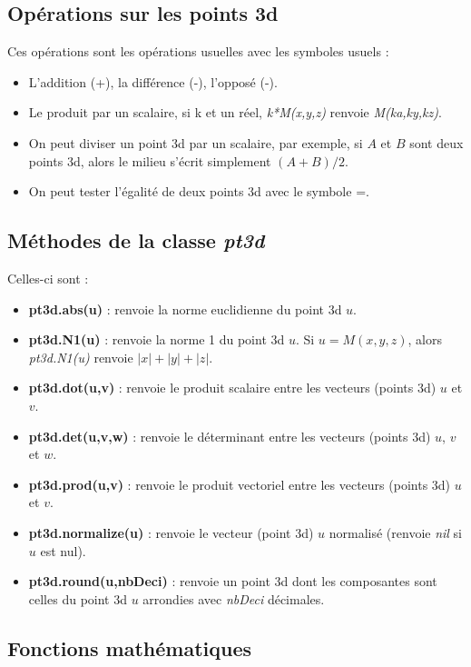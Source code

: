 \documentclass[%
10pt,%
a4paper,%
french,%
]%
{article}%
\begin{document}
\subsection{Opérations sur les points 3d}

Ces opérations sont les opérations usuelles avec les symboles usuels :
\begin{itemize}
    \item L'addition (+), la différence (-), l'opposé (-).
    \item Le produit par un scalaire, si k et un réel, \emph{k*M(x,y,z)} renvoie \emph{M(ka,ky,kz)}.
    \item On peut diviser un point 3d par un scalaire, par exemple, si $A$ et $B$ sont deux points 3d, alors le milieu s'écrit simplement $(A+B)/2$.
    \item On peut tester l'égalité de deux points 3d avec le symbole =.
\end{itemize}

\subsection{Méthodes de la classe \emph{pt3d}}

Celles-ci sont :
\begin{itemize}
    \item \textbf{pt3d.abs(u)} : renvoie la norme euclidienne du point 3d $u$.
    \item \textbf{pt3d.N1(u)} : renvoie la norme 1 du point 3d $u$. Si $u=M(x,y,z)$, alors \emph{pt3d.N1(u)} renvoie $|x|+|y|+|z|$.
    \item \textbf{pt3d.dot(u,v)} : renvoie le produit scalaire entre les vecteurs (points 3d) $u$ et $v$.
    \item \textbf{pt3d.det(u,v,w)} : renvoie le déterminant entre les vecteurs (points 3d) $u$, $v$ et $w$.
    \item \textbf{pt3d.prod(u,v)} : renvoie le produit vectoriel entre les vecteurs (points 3d) $u$ et $v$.
    \item \textbf{pt3d.normalize(u)} : renvoie le vecteur (point 3d) $u$ normalisé (renvoie \emph{nil} si $u$ est nul).
    \item \textbf{pt3d.round(u,nbDeci)} : renvoie un point 3d dont les composantes sont celles du point 3d $u$ arrondies avec \emph{nbDeci} décimales.
\end{itemize}

\subsection{Fonctions mathématiques}
\end{document}
